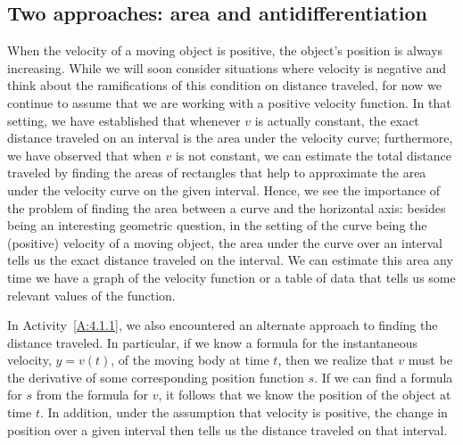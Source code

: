 \subsection*{Two approaches: area and antidifferentiation}

When the velocity of a moving object is positive, the object's position is always increasing.  While we will soon consider situations where velocity is negative and think about the ramifications of this condition on distance traveled, for now we continue to assume that we are working with a positive velocity function.  In that setting, we have established that whenever $v$ is actually constant, the exact distance traveled on an interval is the area under the velocity curve; furthermore, we have observed that when $v$ is not constant, we can estimate the total distance traveled by finding the areas of rectangles that help to approximate the area under the velocity curve on the given interval.  Hence, we see the importance of the problem of finding the area between a curve and the horizontal axis:  besides being an interesting geometric question, in the setting of the curve being the (positive) velocity of a moving object, the area under the curve over an interval tells us the exact distance traveled on the interval.  We can estimate this area any time we have a graph of the velocity function or a table of data that tells us some relevant values of the function.

In Activity~\ref{A:4.1.1}, we also encountered an alternate approach to finding the distance traveled.  In particular, if we know a formula for the instantaneous velocity, $y = v(t)$, of the moving body at time $t$, then we realize that $v$ must be the derivative of some corresponding position function $s$.  If we can find a formula for $s$ from the formula for $v$, it follows that we know the position of the object at time $t$.  In addition, under the assumption that velocity is positive, the change in position over a given interval then tells us the distance traveled on that interval.  


